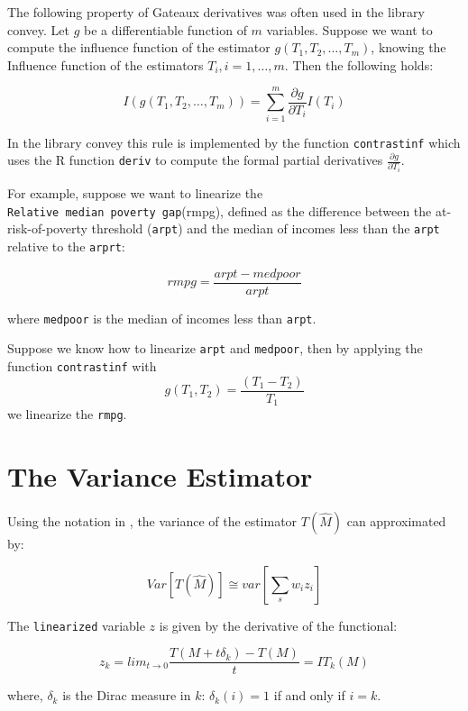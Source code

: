 \documentclass[]{book}
\theoremstyle{definition}
\theoremstyle{definition}
\theoremstyle{remark}
\begin{document}
The following property of Gateaux derivatives was often used in the
library convey. Let \(g\) be a differentiable function of \(m\)
variables. Suppose we want to compute the influence function of the
estimator \(g(T_1, T_2,\ldots, T_m)\), knowing the Influence function of
the estimators \(T_i, i=1,\ldots, m\). Then the following holds:

\[
I(g(T_1, T_2,\ldots, T_m)) = \sum_{i=1}^m \frac{\partial g}{\partial T_i}I(T_i)
\]

In the library convey this rule is implemented by the function
\texttt{contrastinf} which uses the R function \texttt{deriv} to compute
the formal partial derivatives \(\frac{\partial g}{\partial T_i}\).

For example, suppose we want to linearize the
\texttt{Relative\ median\ poverty\ gap}(rmpg), defined as the difference
between the at-risk-of-poverty threshold (\texttt{arpt}) and the median
of incomes less than the \texttt{arpt} relative to the \texttt{arprt}:

\[
rmpg= \frac{arpt-medpoor} {arpt}
\]

where \texttt{medpoor} is the median of incomes less than \texttt{arpt}.

Suppose we know how to linearize \texttt{arpt} and \texttt{medpoor},
then by applying the function \texttt{contrastinf} with \[
g(T_1,T_2)= \frac{(T_1 - T_2)}{T_1}
\] we linearize the \texttt{rmpg}.

\section{The Variance Estimator}\label{the-variance-estimator}

Using the notation in \citep{osier2009}, the variance of the estimator
\(T(\hat{M})\) can approximated by:

\begin{equation}
Var\left[T(\hat{M})\right]\cong var\left[\sum_s w_i z_i\right]
\label{eq:var}
\end{equation}

The \texttt{linearized} variable \(z\) is given by the derivative of the
functional:

\begin{equation}
z_k=lim_{t\rightarrow0}\frac{T(M+t\delta_k)-T(M)}{t}=IT_k(M)
\label{eq:lin}
\end{equation}

where, \(\delta_k\) is the Dirac measure in \(k\): \(\delta_k(i)=1\) if
and only if \(i=k\).
\end{document}
